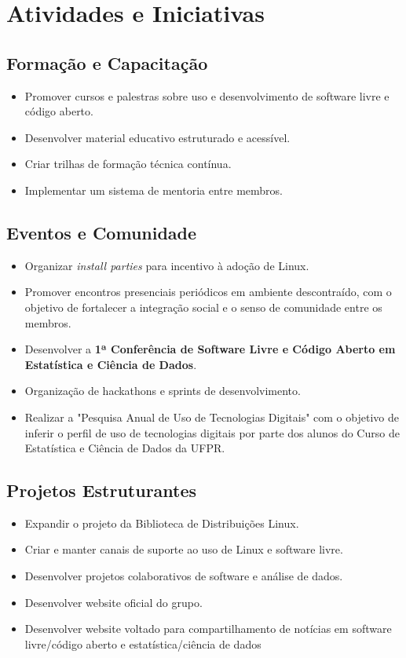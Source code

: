 \documentclass[11pt,a4paper]{article}
\begin{document}
\section{Atividades e Iniciativas}

\subsection{Formação e Capacitação}

\begin{itemize}
    \item Promover cursos e palestras sobre uso e desenvolvimento de software livre e código aberto.
    \item Desenvolver material educativo estruturado e acessível.
    \item Criar trilhas de formação técnica contínua.
    \item Implementar um sistema de mentoria entre membros.
\end{itemize}

\subsection{Eventos e Comunidade}

\begin{itemize}
    \item Organizar \textit{install parties} para incentivo à adoção de Linux.
    \item Promover encontros presenciais periódicos em ambiente descontraído, com o objetivo de fortalecer a integração social e o senso de comunidade entre os membros.
    \item Desenvolver a \textbf{1ª Conferência de Software Livre e Código Aberto em Estatística e Ciência de Dados}.
    \item Organização de hackathons e sprints de desenvolvimento.
    \item Realizar a "Pesquisa Anual de Uso de Tecnologias Digitais" com o objetivo de inferir o perfil de uso de tecnologias digitais por parte dos alunos do Curso de Estatística e Ciência de Dados da UFPR.
\end{itemize}

\subsection{Projetos Estruturantes}

\begin{itemize}
    \item Expandir o projeto da Biblioteca de Distribuições Linux.
    \item Criar e manter canais de suporte ao uso de Linux e software livre.
    \item Desenvolver projetos colaborativos de software e análise de dados.
    \item Desenvolver website oficial do grupo.
    \item Desenvolver website voltado para compartilhamento de notícias em software livre/código aberto e estatística/ciência de dados
\end{itemize}
\end{document}
